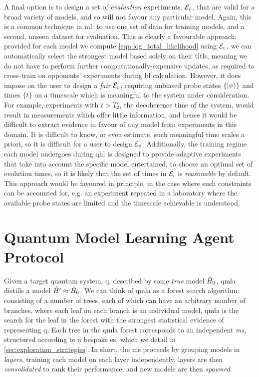 A final option is to design a set of \emph{evaluation} experiments, ${ \mathcal{E} }_v$, 
    that are valid for a broad variety of models, and so will not favour any particular model.
Again, this is a common technique in \gls{ml}: to use one set of data for training models, 
    and a second, unseen dataset for evaluation. 
This is clearly a favourable approach: 
    provided for each model we compute \cref{eqn:log_total_likelihood} using ${ \mathcal{E} }_v$,
    we can automatically select the strongest model based solely on their \glspl{tltl}, 
    meaning we do not have to perform further computationally-expensive updates, 
    as required to cross-train on opponents' 
    experiments during \gls{bf} calculation. 
However, it does impose on the user to design a \emph{fair} ${ \mathcal{E} }_v$, 
    requiring unbiased probe states $\{\ket{\psi}\}$ and times $\{t\}$ on a timescale 
    which is meaningful to the system under consideration. 
For example, experiments with $t > T_2$, the decoherence time of the system, 
    would result in measurements which offer little information, 
    and hence it would be difficult to extract evidence in favour of any 
    model from experiments in this domain.
It is difficult to know, or even estimate, such meaningful time scales a priori,
    so it is difficult for a user to design ${ \mathcal{E} }_v$. 
Additionally, the training regime each model undergoes during \gls{qhl}
    is designed to provide adaptive experiments that take into account
    the specific model entertained, to choose an optimal set of evolution times, 
    so it is likely that the set of times in ${ \mathcal{E} }_i$ is \emph{reasonable} by default. 
This approach would be favoured in principle, in the case where such constraints can be accounted for,
    e.g. an experiment repeated in a laboratory where the available 
    probe states are limited and the timescale achievable is understood. 
     
\section{Quantum Model Learning Agent Protocol}\label{sec:qmla_protocol}
Given a target quantum system, \gls{q}, described by some \emph{true} model $\hat{H}_0$, 
    \gls{qmla} distills a model $\hat{H}^{\prime} \approx \hat{H}_0$.
We can think of \gls{qmla} as a forest search algorithm\footnotemark:
    consisting of a number of trees, each of which can have an arbitrary number of branches, 
    where each leaf on each branch is an individual model, 
    \gls{qmla} is the search for the leaf in the forest with the 
    strongest statistical evidence of representing \gls{q}. 
Each tree in the \gls{qmla} forest corresponds to an independent \emph{\gls{ms}}, 
    structured according to a bespoke \gls{es}, which we detail in \cref{sec:exploration_strategies}. 
In short, the \gls{ms} proceeds by grouping models in \emph{layers},
    training each model on each layer independently,
    layers are then \emph{consolidated} to rank their performance,
    and new models are then \emph{spawned}. 

